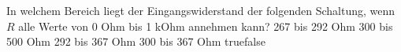     {In welchem Bereich liegt der Eingangswiderstand der folgenden Schaltung, wenn $R$ alle Werte von 0 Ohm bis 1 kOhm annehmen kann? }
    {267 bis 292 Ohm}
    {300 bis 500 Ohm}
    {292 bis 367 Ohm}
    {300 bis 367 Ohm}
    {true}{false}